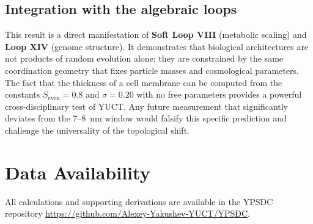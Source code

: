 \documentclass[12pt,a4paper]{article}
\begin{document}
	\subsection*{Integration with the algebraic loops}
	
	This result is a direct manifestation of \textbf{Soft Loop VIII} (metabolic scaling) and \textbf{Loop XIV} (genome structure). It demonstrates that biological architectures are not products of random evolution alone; they are constrained by the same coordination geometry that fixes particle masses and cosmological parameters. The fact that the thickness of a cell membrane can be computed from the constants \(S_{\mathrm{even}} = 0.8\) and \(\sigma = 0.20\) with no free parameters provides a powerful cross‑disciplinary test of YUCT. Any future measurement that significantly deviates from the 7–8~nm window would falsify this specific prediction and challenge the universality of the topological shift.
	
	\section*{Data Availability}
	All calculations and supporting derivations are available in the YPSDC \\ repository \url{https://github.com/Alexey-Yakushev-YUCT/YPSDC}.
	
\end{document}
